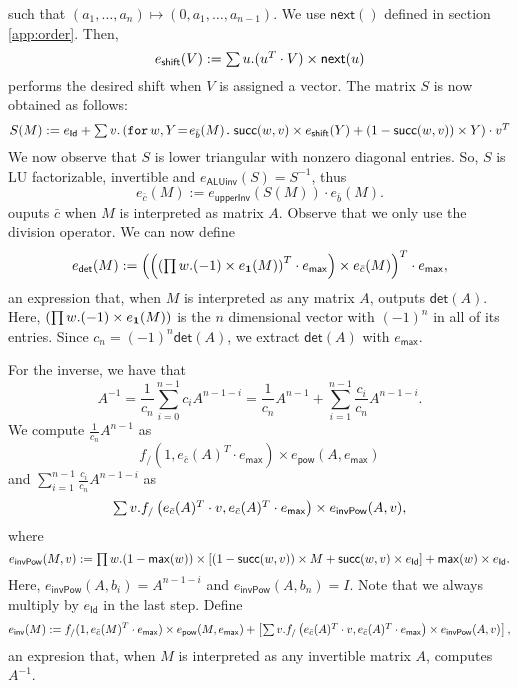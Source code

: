 such that $(a_1,\ldots,a_n)\mapsto (0,a_1,\ldots,a_{n-1})$. We use $\mathsf{next}()$ defined in section \ref{app:order}. Then,
$$
e_{\mathsf{shift}}(V):=\ssum u.(u^T\cdot V)\times\mathsf{next}(u)
$$
performs the desired shift when $V$ is assigned a vector. The matrix $S$ is now obtained as follows:
$$
S(M):= e_{\mathsf{Id}} + \ssum v. \left( \initf{e_{\bar b}(M)}{w}{Y}\mathsf{succ}(w,v)\times e_{\mathsf{shift}}(Y) + (1 - \mathsf{succ}(w,v))\times Y \right)\cdot v^T
$$
We now observe that $S$ is lower triangular with nonzero diagonal entries. So, $S$ is LU factorizable, invertible
and $e_{\mathsf{ALUinv}}(S)=S^{-1}$, thus
$$
e_{\bar c}(M):=e_{\mathsf{upperInv}}(S(M))\cdot e_{\bar b}(M).
$$
ouputs $\bar c$ when $M$ is interpreted as matrix $A$. Observe that we only use the division operator.
We can now define
$$
e_{\mathsf{det}}(M):=\left( \left(\left( \sprod w. (-1)\times e_{\ones}(M)\right)^T\cdot e_{\mathsf{max}}\right) \times e_{\bar c}(M) \right)^T\cdot e_{\mathsf{max}},
$$
an expression that, when $M$ is interpreted as any matrix $A$, outputs $\mathsf{det}(A)$.
Here, $(\sprod w. (-1)\times e_{\ones}(M))$ is the $n$ dimensional vector with $(-1)^n$ in all of its entries.
Since $c_n=(-1)^n\mathsf{det}(A)$, we extract $\mathsf{det}(A)$ with $e_{\mathsf{max}}$.

For the inverse, we have that
$$
A^{-1}=\frac{1}{c_n}\sum_{i=0}^{n-1}c_i A^{n-1-i} = \frac{1}{c_n}A^{n-1} + \sum_{i=1}^{n-1}\frac{c_i}{c_n}A^{n-1-i}.
$$
We compute $\frac{1}{c_n}A^{n-1}$ as
$$
f_{/}(1, e_{\bar c}(A)^T\cdot e_{\mathsf{max}})\times e_{\mathsf{pow}}(A, e_{\mathsf{max}})
$$
and $\sum_{i=1}^{n-1}\frac{c_i}{c_n}A^{n-1-i}$ as
$$
\ssum v. f_{/}\left( e_{\bar c}(A)^T\cdot v, e_{\bar c}(A)^T\cdot e_{\mathsf{max}} \right)\times e_{\mathsf{invPow}}(A, v),
$$
where
$$
e_{\mathsf{invPow}}(M, v):= \sprod w. (1-\mathsf{max}(w)) \times \left[ (1 - \mathsf{succ}(w,v))\times M + \mathsf{succ}(w,v)\times e_{\mathsf{Id}} \right] + \mathsf{max}(w)\times e_{\mathsf{Id}}.
$$
Here, $e_{\mathsf{invPow}}(A, b_i)=A^{n-1-i}$ and $e_{\mathsf{invPow}}(A, b_n)=I$.
Note that we always multiply by $e_{\mathsf{Id}}$ in the last step.
Define
$$
e_{\mathsf{inv}}(M):= f_{/}(1, e_{\bar c}(M)^T\cdot e_{\mathsf{max}})\times e_{\mathsf{pow}}(M, e_{\mathsf{max}}) + \left[ \ssum v. f_{/}\left( e_{\bar c}(A)^T\cdot v, e_{\bar c}(A)^T\cdot e_{\mathsf{max}} \right)\times e_{\mathsf{invPow}}(A, v) \right],
$$
an expresion that, when $M$ is interpreted as any invertible matrix $A$, computes $A^{-1}$.


